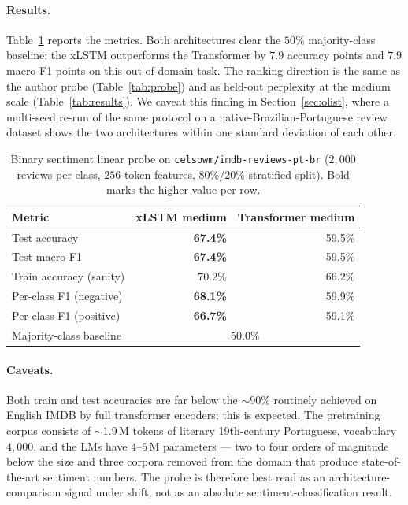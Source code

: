 \documentclass[11pt]{article}
\begin{document}
\paragraph{Results.}
Table~\ref{tab:sentiment} reports the metrics. Both architectures
clear the $50\%$ majority-class baseline; the xLSTM outperforms the
Transformer by $7.9$ accuracy points and $7.9$ macro-F1 points on this
out-of-domain task. The ranking direction is the same as the author
probe (Table~\ref{tab:probe}) and as held-out perplexity at the medium
scale (Table~\ref{tab:results}). We caveat this finding in
Section~\ref{sec:olist}, where a multi-seed re-run of the same protocol
on a native-Brazilian-Portuguese review dataset shows the two
architectures within one standard deviation of each other.

\begin{table}[h]
\centering
\caption{Binary sentiment linear probe on
  \texttt{celsowm/imdb-reviews-pt-br} ($2{,}000$ reviews per class,
  $256$-token features, $80\%/20\%$ stratified split). Bold marks the
  higher value per row.}
\label{tab:sentiment}
\small
\setlength{\tabcolsep}{6pt}
\begin{tabular}{lrr}
\toprule
Metric & xLSTM medium & Transformer medium \\
\midrule
Test accuracy            & \textbf{67.4\%} & 59.5\% \\
Test macro-F1            & \textbf{67.4\%} & 59.5\% \\
Train accuracy (sanity)  & $70.2\%$        & $66.2\%$ \\
Per-class F1 (negative)  & \textbf{68.1\%} & 59.9\% \\
Per-class F1 (positive)  & \textbf{66.7\%} & 59.1\% \\
Majority-class baseline  & \multicolumn{2}{c}{$50.0\%$} \\
\bottomrule
\end{tabular}
\end{table}

\paragraph{Caveats.}
Both train and test accuracies are far below the $\sim$90\% routinely
achieved on English IMDB by full transformer encoders; this is
expected. The pretraining corpus consists of $\sim$1.9\,M tokens of
literary 19th-century Portuguese, vocabulary $4{,}000$, and the LMs
have $4$--$5$\,M parameters --- two to four orders of magnitude below
the size and three corpora removed from the domain that produce
state-of-the-art sentiment numbers. The probe is therefore best read
as an architecture-comparison signal under shift, not as an absolute
sentiment-classification result.
\end{document}
